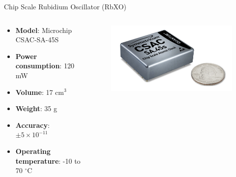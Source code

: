\begin{frame}{Chip Scale Rubidium Oscillator (RbXO)}

    \begin{columns}[t]
        \begin{column}[t]{0.68\textwidth}
            \begin{itemize}
                \item \textbf{Model}: Microchip CSAC-SA-45S
                \vspace{0.2cm}
                \item \textbf{Power consumption}: 120 mW
                \vspace{0.2cm}
                \item \textbf{Volume}: 17 cm$^{3}$
                \vspace{0.2cm}
                \item \textbf{Weight}: 35 g
                \vspace{0.2cm}
                \item \textbf{Accuracy}: $\pm 5 \times 10^{-11}$
                \vspace{0.2cm}
                \item \textbf{Operating temperature}: -10 to 70 $^{\circ}$C
            \end{itemize}
        \end{column}
        \begin{column}[t]{0.5\textwidth}
            \begin{figure}[!ht]
                \begin{center}
                    \includegraphics[width=\columnwidth]{figures/microchip-csac}
                \end{center}
            \end{figure}
        \end{column}
    \end{columns}

\end{frame}

